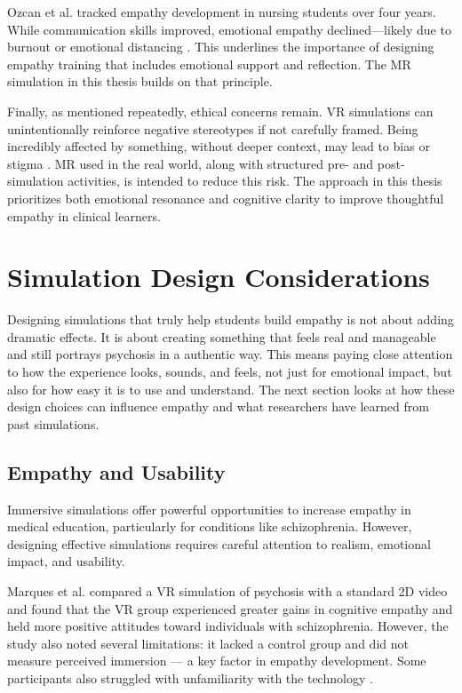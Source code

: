 Ozcan et al. tracked empathy development in nursing students over four years. While communication skills improved, emotional empathy declined—likely due to burnout or emotional distancing \cite{Ozcan2018}. This underlines the importance of designing empathy training that includes emotional support and reflection. The MR simulation in this thesis builds on that principle.

Finally, as mentioned repeatedly, ethical concerns remain. VR simulations can unintentionally reinforce negative stereotypes if not carefully framed. Being incredibly affected by something, without deeper context, may lead to bias or stigma \cite{Rueda2020}. MR used in the real world, along with structured pre- and post-simulation activities, is intended to reduce this risk. The approach in this thesis prioritizes both emotional resonance and cognitive clarity to improve thoughtful empathy in clinical learners.


\section{Simulation Design Considerations}

Designing simulations that truly help students build empathy is not about adding dramatic effects. It is about creating something that feels real and manageable and still portrays psychosis in a authentic way. This means paying close attention to how the experience looks, sounds, and feels, not just for emotional impact, but also for how easy it is to use and understand. The next section looks at how these design choices can influence empathy and what researchers have learned from past simulations.

\subsection{Empathy and Usability}
Immersive simulations offer powerful opportunities to increase empathy in medical education, particularly for conditions like schizophrenia. However, designing effective simulations requires careful attention to realism, emotional impact, and usability.

Marques et al. compared a VR simulation of psychosis with a standard 2D video and found that the VR group experienced greater gains in cognitive empathy and held more positive attitudes toward individuals with schizophrenia. However, the study also noted several limitations: it lacked a control group and did not measure perceived immersion — a key factor in empathy development. Some participants also struggled with unfamiliarity with the technology \cite{Marques2022}.

